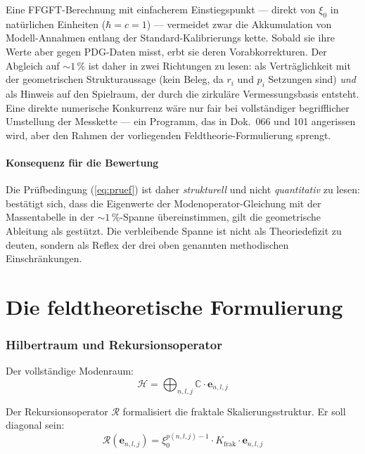 Eine FFGFT-Berechnung mit einfacherem Einstiegspunkt --- direkt von
$\xi_0$ in natürlichen Einheiten ($\hbar = c = 1$) --- vermeidet zwar
die Akkumulation von Modell-Annahmen entlang der Standard-Kalibrierungs%
kette. Sobald sie ihre Werte aber gegen PDG-Daten misst, erbt sie
deren Vorabkorrekturen. Der Abgleich auf $\sim 1\,\%$ ist daher in zwei
Richtungen zu lesen: als Verträglichkeit mit der geometrischen
Strukturaussage (kein Beleg, da $r_i$ und $p_i$ Setzungen sind) \emph{und} als Hinweis auf den Spielraum, der durch die zirkuläre
Vermessungsbasis entsteht. Eine direkte numerische Konkurrenz wäre
nur fair bei vollständiger begrifflicher Umstellung der Messkette ---
ein Programm, das in Dok.~066 und 101 angerissen wird, aber den Rahmen
der vorliegenden Feldtheorie-Formulierung sprengt.

\subsection*{Konsequenz für die Bewertung}

Die Prüfbedingung (\ref{eq:pruef}) ist daher \emph{strukturell} und
nicht \emph{quantitativ} zu lesen: bestätigt sich, dass die Eigenwerte
der Modenoperator-Gleichung mit der Massentabelle in der
$\sim 1\,\%$-Spanne übereinstimmen, gilt die geometrische Ableitung
als gestützt. Die verbleibende Spanne ist nicht als Theoriedefizit zu
deuten, sondern als Reflex der drei oben genannten methodischen
Einschränkungen.

\part{Die feldtheoretische Formulierung}

\section{Hilbertraum und Rekursionsoperator}

Der vollständige Modenraum:
\begin{equation}
  \mathcal{H} = \bigoplus_{n,l,j} \mathbb{C}\cdot\mathbf{e}_{n,l,j}
\end{equation}

Der Rekursionsoperator $\mathcal{R}$ formalisiert die fraktale
Skalierungsstruktur. Er soll diagonal sein:
\begin{equation}
  \mathcal{R}(\mathbf{e}_{n,l,j})
  = \xi_0^{p(n,l,j)-1} \cdot K_{\text{frak}} \cdot \mathbf{e}_{n,l,j}
\end{equation}

